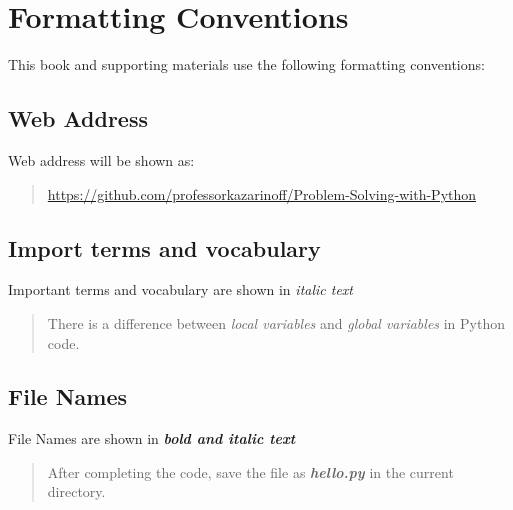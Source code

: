 \documentclass{book}
\begin{document}
    
        \section{Formatting Conventions}\label{formatting-conventions}
    




    
        This book and supporting materials use the following formatting
conventions:
    




    
        \subsection{Web Address}\label{web-address}

Web address will be shown as:

\begin{quote}
\url{https://github.com/professorkazarinoff/Problem-Solving-with-Python}
\end{quote}
    




    
        \subsection{Import terms and
vocabulary}\label{import-terms-and-vocabulary}

Important terms and vocabulary are shown in \emph{italic text}

\begin{quote}
There is a difference between \emph{local variables} and \emph{global
variables} in Python code.
\end{quote}
    




    
        \subsection{File Names}\label{file-names}

File Names are shown in \textbf{\emph{bold and italic text}}

\begin{quote}
After completing the code, save the file as \textbf{\emph{hello.py}} in
the current directory.
\end{quote}
    
\end{document}
